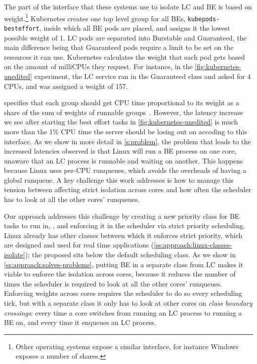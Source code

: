 The part of the \cgroups{} interface that these systems use to isolate LC and BE
is based on weight.\footnote{Other operating systems expose a similar interface,
for instance Windows exposes a number of shares.} Kubernetes creates one top
level group for all BEs, \texttt{kubepods-besteffort}, inside which all BE pods
are placed, and assigns it the lowest possible weight of 1. LC pods are
separated into Burstable and Guaranteed, the main difference being that
Guaranteed pods require a limit to be set on the resources it can use.
Kubernetes calculates the weight that each pod gets based on the amount of
milliCPUs they request. For instance, in the \autoref{fig:kubernetes-unedited}
experiment, the LC service ran in the Guaranteed class and asked for 4 CPUs, and
was assigned a weight of 157. 

\cgroups{} specifies that each group should get CPU time proportional to its
weight as a share of the sum of weights of runnable
groups~\cite{cgroups-kerneldocs}. However, the latency increase we see after
starting the best effort tasks in \autoref{fig:kubernetes-unedited} is much more
than the 1\% CPU time the server should be losing out on accoding to this
interface. As we show in more detail in \autoref{s:problem}, the problem that
leads to the increased latencies observed is that Linux will run a BE process on
one core, unaware that an LC process is runnable and waiting on another. This
happens because Linux uses per-CPU runqueues, which avoids the overheads of
having a global runqueue. A key challenge this work addresses is how to manage
this tension between affecting strict isolation across cores and how often the
scheduler has to look at all the other cores' runqueues.

Our approach addresses this challenge by creating a new priority class for BE
tasks to run in, \beclass{}, and enforcing it in the scheduler via strict
priority scheduling. Linux already has other classes between which it enforces
strict priority, which are designed and used for real time applications
(\autoref{ss:approach:linux-classes-isolate}); the proposed \beclass{} sits
below the default scheduling class. As we show in
\autoref{ss:approach:solves-problems}, putting BE in a separate class from LC
makes it viable to enforce the isolation across cores, because it reduces the
number of times the scheduler is required to look at all the other cores'
runqueues. Enforcing weights across cores requires the scheduler to do so every
scheduling tick, but with a separate class it only has to look at other cores on
\textit{class boundary crossings}: every time a core switches from running an LC
process to running a BE on, and every time it enqueues an LC process.


